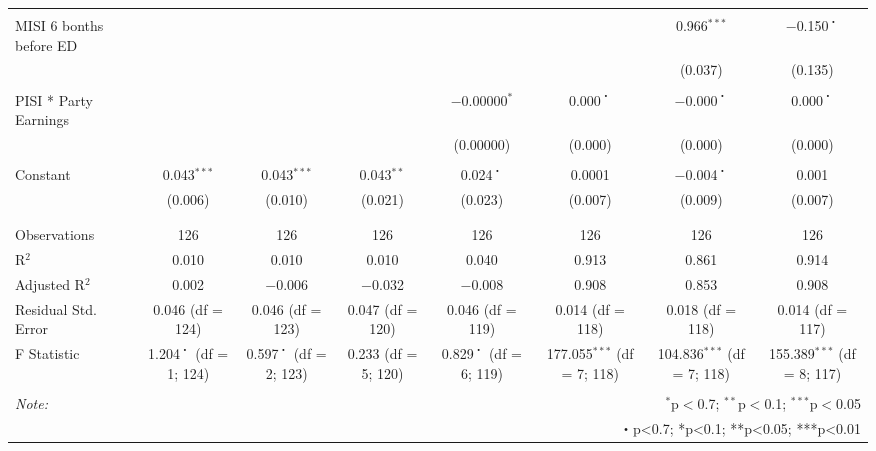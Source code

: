 \begin{table}[!htbp]
\begin{tabular}{@{\extracolsep{10pt}}lccccccc}
  & & & & & & & \\
 MISI 6 bonths before ED &  &  &  &  &  & 0.966$^{***}$ & $-$0.150$^{・}$ \\
  &  &  &  &  &  & (0.037) & (0.135) \\
  & & & & & & & \\
 PISI * Party Earnings &  &  &  & $-$0.00000$^{*}$ & 0.000$^{・}$ & $-$0.000$^{・}$ & 0.000$^{・}$ \\
  &  &  &  & (0.00000) & (0.000) & (0.000) & (0.000) \\
  & & & & & & & \\
 Constant & 0.043$^{***}$ & 0.043$^{***}$ & 0.043$^{**}$ & 0.024$^{・}$ & 0.0001 & $-$0.004$^{・}$ & 0.001 \\
  & (0.006) & (0.010) & (0.021) & (0.023) & (0.007) & (0.009) & (0.007) \\
  & & & & & & & \\
\hline \\[-1.8ex]
Observations & 126 & 126 & 126 & 126 & 126 & 126 & 126 \\
R$^{2}$ & 0.010 & 0.010 & 0.010 & 0.040 & 0.913 & 0.861 & 0.914 \\
Adjusted R$^{2}$ & 0.002 & $-$0.006 & $-$0.032 & $-$0.008 & 0.908 & 0.853 & 0.908 \\
Residual Std. Error & 0.046 (df = 124) & 0.046 (df = 123) & 0.047 (df = 120) & 0.046 (df = 119) & 0.014 (df = 118) & 0.018 (df = 118) & 0.014 (df = 117) \\
F Statistic & 1.204$^{・}$ (df = 1; 124) & 0.597$^{・}$ (df = 2; 123) & 0.233 (df = 5; 120) & 0.829$^{・}$ (df = 6; 119) & 177.055$^{***}$ (df = 7; 118) & 104.836$^{***}$ (df = 7; 118) & 155.389$^{***}$ (df = 8; 117) \\
\hline
\hline \\[-1.8ex]
\textit{Note:}  & \multicolumn{7}{r}{$^{*}$p$<$0.7; $^{**}$p$<$0.1; $^{***}$p$<$0.05} \\
 & \multicolumn{7}{r}{・p<0.7; *p<0.1; **p<0.05; ***p<0.01} \\
\end{tabular}
\end{table}
